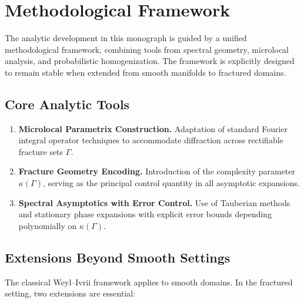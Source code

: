 

\section{Methodological Framework}

The analytic development in this monograph is guided by a unified methodological 
framework, combining tools from spectral geometry, microlocal analysis, and 
probabilistic homogenization. The framework is explicitly designed to remain 
stable when extended from smooth manifolds to fractured domains.

\subsection*{Core Analytic Tools}

\begin{enumerate}[label=\textbf{M\arabic*}]
    \item \textbf{Microlocal Parametrix Construction.} 
    Adaptation of standard Fourier integral operator techniques to accommodate 
    diffraction across rectifiable fracture sets $\Gamma$.

    \item \textbf{Fracture Geometry Encoding.} 
    Introduction of the complexity parameter $\kappa(\Gamma)$, serving as the 
    principal control quantity in all asymptotic expansions. 

    \item \textbf{Spectral Asymptotics with Error Control.}
    Use of Tauberian methods and stationary phase expansions with explicit 
    error bounds depending polynomially on $\kappa(\Gamma)$.
\end{enumerate}

\subsection*{Extensions Beyond Smooth Settings}

The classical Weyl–Ivrii framework applies to smooth domains. 
In the fractured setting, two extensions are essential:

